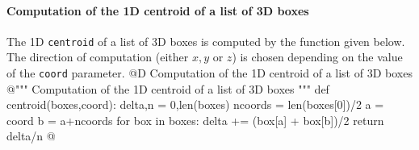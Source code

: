 \documentclass[11pt,oneside]{article}    %
\begin{document}
\paragraph{Computation of the 1D centroid of a list of 3D boxes}
The 1D \texttt{centroid} of a list of 3D boxes is computed by the function given below.
The direction of computation (either $x,y$ or $z$) is chosen depending on the value of the \texttt{coord} parameter. 
@D Computation of the 1D centroid of a list of 3D boxes
@{""" Computation of the 1D centroid of a list of 3D boxes """    
def centroid(boxes,coord):
    delta,n = 0,len(boxes)
    ncoords = len(boxes[0])/2
    a = coord%
    b = a+ncoords
    for box in boxes:
        delta += (box[a] + box[b])/2
    return delta/n
@}



\end{document}
